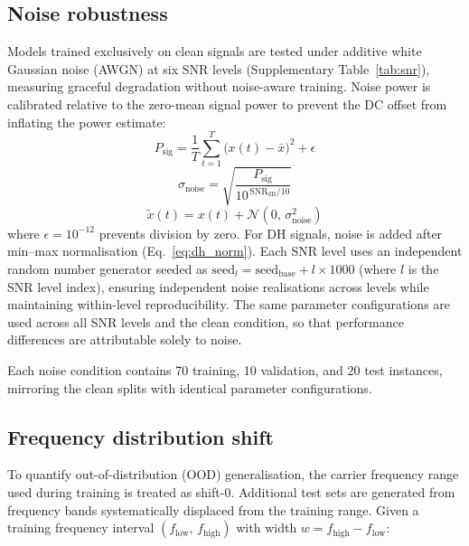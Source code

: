 \documentclass[11pt]{article}
\begin{document}
\subsection{Noise robustness}
\label{sec:noise}

Models trained exclusively on clean signals are tested under additive white Gaussian noise (AWGN) at six SNR levels (Supplementary Table~\ref{tab:snr}), measuring graceful degradation without noise-aware training. Noise power is calibrated relative to the zero-mean signal power to prevent the DC offset from inflating the power estimate:
\begin{equation}
    P_{\mathrm{sig}} = \frac{1}{T}\sum_{t=1}^{T}\bigl(x(t) - \bar{x}\bigr)^2 + \epsilon
    \label{eq:sig_power}
\end{equation}
\begin{equation}
    \sigma_{\mathrm{noise}} = \sqrt{\frac{P_{\mathrm{sig}}}{10^{\,\mathrm{SNR}_{\mathrm{dB}}/10}}}
    \label{eq:noise_std}
\end{equation}
\begin{equation}
    \tilde{x}(t) = x(t) + \mathcal{N}(0,\, \sigma_{\mathrm{noise}}^2)
    \label{eq:noisy_signal}
\end{equation}
where $\epsilon = 10^{-12}$ prevents division by zero. For DH signals, noise is added after min--max normalisation (Eq.~\eqref{eq:dh_norm}). Each SNR level uses an independent random number generator seeded as $\mathrm{seed}_l = \mathrm{seed}_{\mathrm{base}} + l \times 1000$ (where $l$ is the SNR level index), ensuring independent noise realisations across levels while maintaining within-level reproducibility. The same parameter configurations are used across all SNR levels and the clean condition, so that performance differences are attributable solely to noise.

Each noise condition contains 70 training, 10 validation, and 20 test instances, mirroring the clean splits with identical parameter configurations.

\subsection{Frequency distribution shift}
\label{sec:ood}

To quantify out-of-distribution (OOD) generalisation, the carrier frequency range used during training is treated as shift-0. Additional test sets are generated from frequency bands systematically displaced from the training range. Given a training frequency interval $(f_{\mathrm{low}},\, f_{\mathrm{high}})$ with width $w = f_{\mathrm{high}} - f_{\mathrm{low}}$:
\end{document}
